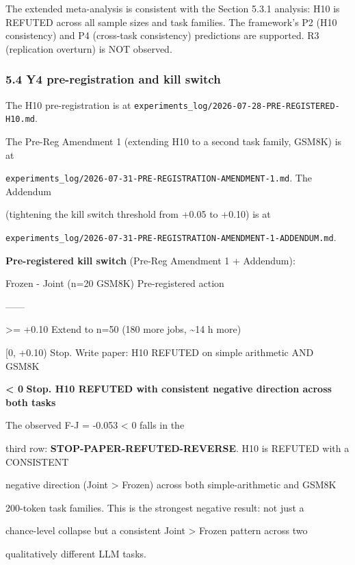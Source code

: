 \documentclass[11pt]{article}
\begin{document}
The extended meta-analysis is consistent with the Section 5.3.1
analysis: H10 is REFUTED across all sample sizes and task families. The
framework's P2 (H10 consistency) and P4 (cross-task consistency)
predictions are supported. R3 (replication overturn) is NOT observed.

\subsubsection{5.4 Y4 pre-registration and kill
switch}\label{y4-pre-registration-and-kill-switch}

The H10 pre-registration is at
\texttt{experiments\_log/2026-07-28-PRE-REGISTERED-H10.md}.

The Pre-Reg Amendment 1 (extending H10 to a second task family, GSM8K)
is at

\texttt{experiments\_log/2026-07-31-PRE-REGISTRATION-AMENDMENT-1.md}.
The Addendum

(tightening the kill switch threshold from +0.05 to +0.10) is at

\texttt{experiments\_log/2026-07-31-PRE-REGISTRATION-AMENDMENT-1-ADDENDUM.md}.

\textbf{Pre-registered kill switch} (Pre-Reg Amendment 1 + Addendum):

Frozen - Joint (n=20 GSM8K) \textbar{} Pre-registered action \textbar{}

\textbar---\textbar---\textbar{}

\textgreater= +0.10 \textbar{} Extend to n=50 (180 more jobs,
\textasciitilde14 h more) \textbar{}

{[}0, +0.10) \textbar{} Stop. Write paper: H10 REFUTED on simple
arithmetic AND GSM8K \textbar{}

\textbf{\textless{} 0} \textbar{} \textbf{Stop. H10 REFUTED with
consistent negative direction across both tasks} \textbar{}

The observed F-J = -0.053 \textless{} 0 falls in the

third row: \textbf{STOP-PAPER-REFUTED-REVERSE}. H10 is REFUTED with a
CONSISTENT

negative direction (Joint \textgreater{} Frozen) across both
simple-arithmetic and GSM8K

200-token task families. This is the strongest negative result: not just
a

chance-level collapse but a consistent Joint \textgreater{} Frozen
pattern across two

qualitatively different LLM tasks.
\end{document}

